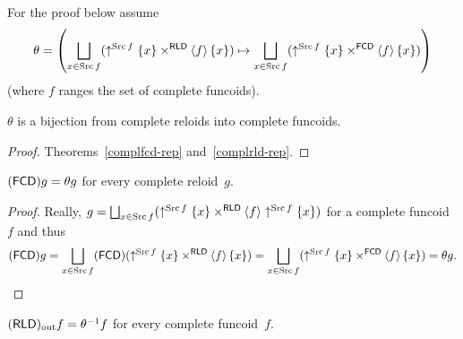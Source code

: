 For the proof below assume 
\[
\theta=\left(\bigsqcup_{x\in\operatorname{Src} f}(\uparrow^{\operatorname{Src} f}\{x\}\times^{\mathsf{RLD}}\left\langle f\right\rangle\{x\})\mapsto\bigsqcup_{x\in\operatorname{Src} f}(\uparrow^{\operatorname{Src} f}\{x\}\times^{\mathsf{FCD}}\left\langle f\right\rangle\{x\})\right)
\]
 (where $f$ ranges the set of complete funcoids).
\begin{lem}
$\theta$ is a bijection from complete reloids into complete funcoids.\end{lem}
\begin{proof}
Theorems~\ref{complfcd-rep} and~\ref{complrld-rep}.\end{proof}
\begin{lem}
$(\mathsf{FCD}) g=\theta g$ for every complete reloid~$g$.\end{lem}
\begin{proof}
Really, $g=\bigsqcup_{x\in\operatorname{Src} f}(\uparrow^{\operatorname{Src} f}\{x\}\times^{\mathsf{RLD}}\left\langle f\right\rangle\uparrow^{\operatorname{Src} f}\{x\})$
for a complete funcoid~$f$ and thus 
\[
(\mathsf{FCD}) g=\bigsqcup_{x\in\operatorname{Src} f}(\mathsf{FCD})(\uparrow^{\operatorname{Src} f}\{x\}\times^{\mathsf{RLD}}\left\langle f\right\rangle\{x\})=\bigsqcup_{x\in\operatorname{Src} f}(\uparrow^{\operatorname{Src} f}\{x\}\times^{\mathsf{FCD}}\left\langle f\right\rangle\{x\})=\theta g.
\]
\end{proof}
\begin{lem}
$(\mathsf{RLD})_{\mathrm{out}} f=\theta^{-1}f$ for every complete funcoid~$f$.\end{lem}
